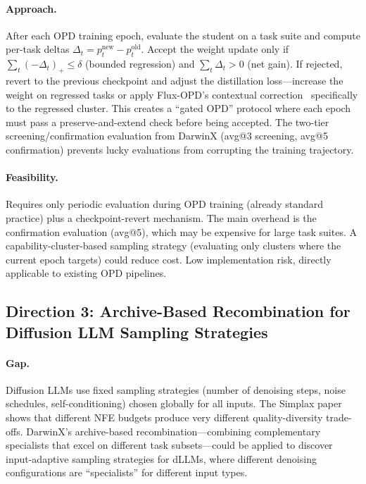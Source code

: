 \documentclass[11pt,a4paper]{article}
\begin{document}
\paragraph{Approach.} After each OPD training epoch, evaluate the student on a task suite and compute per-task deltas $\Delta_t = p_t^{\text{new}} - p_t^{\text{old}}$. Accept the weight update only if $\sum_t (-\Delta_t)_+ \leq \delta$ (bounded regression) and $\sum_t \Delta_t > 0$ (net gain). If rejected, revert to the previous checkpoint and adjust the distillation loss---increase the weight on regressed tasks or apply Flux-OPD's contextual correction~\cite{flux2026opd} specifically to the regressed cluster. This creates a ``gated OPD'' protocol where each epoch must pass a preserve-and-extend check before being accepted. The two-tier screening/confirmation evaluation from DarwinX (avg@3 screening, avg@5 confirmation) prevents lucky evaluations from corrupting the training trajectory.

\paragraph{Feasibility.} Requires only periodic evaluation during OPD training (already standard practice) plus a checkpoint-revert mechanism. The main overhead is the confirmation evaluation (avg@5), which may be expensive for large task suites. A capability-cluster-based sampling strategy (evaluating only clusters where the current epoch targets) could reduce cost. Low implementation risk, directly applicable to existing OPD pipelines.

\subsection{Direction 3: Archive-Based Recombination for Diffusion LLM Sampling Strategies}

\paragraph{Gap.} Diffusion LLMs use fixed sampling strategies (number of denoising steps, noise schedules, self-conditioning) chosen globally for all inputs. The Simplax paper~\cite{simplax2026} shows that different NFE budgets produce very different quality-diversity trade-offs. DarwinX's archive-based recombination---combining complementary specialists that excel on different task subsets---could be applied to discover input-adaptive sampling strategies for dLLMs, where different denoising configurations are ``specialists'' for different input types.
\end{document}
